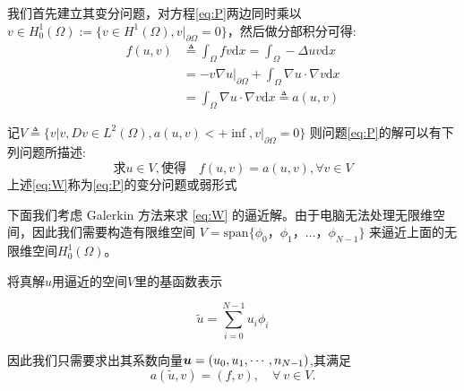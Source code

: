 我们首先建立其变分问题，对方程\eqref{eq:P}两边同时乘以$v \in H^1_0(\Omega) := \{v\in H^1(\Omega), v|_{\partial\Omega} = 0\}$，然后做分部积分可得:
\begin{align*}
	f(u,v) &\triangleq  \int_{\Omega} f v \mathrm{d}x = \int_{\Omega}- \Delta u v \mathrm{d}x  \\ 
	&=-v\nabla u \big|_{\partial \Omega} + \int_{\Omega} \nabla u\cdot\nabla v\mathrm{d}x \\
	&=\int_{\Omega} \nabla u\cdot\nabla v\mathrm{d}x\triangleq a(u,v)
\end{align*}

记$V \triangleq \{v \big| v,Dv \in L^2(\Omega) , a(u,v) < + \inf , v|_{\partial\Omega} = 0\}$
则问题\eqref{eq:P}的解可以有下列问题所描述:
\begin{equation}\label{eq:W}
	\text{求} u \in V, \text{使得}\quad f(u,v)=a(u,v) , \forall v \in V 
\end{equation}
上述\eqref{eq:W}称为\eqref{eq:P}的变分问题或弱形式

下面我们考虑 Galerkin 方法来求 \eqref{eq:W} 的逼近解。由于电脑无法处理无限维空间，因此我们需要构造有限维空间 $V=\mathrm{span}\{\phi_0，\phi_1，\ldots，
\phi_{N-1}\}$ 来逼近上面的无限维空间$H_0^1(\Omega)$。

将真解$u$用逼近的空间$V$里的基函数表示

\begin{equation}\label{eq:b}
	\tilde u= \sum_{i=0}^{N-1}u_i \phi_i
\end{equation}

因此我们只需要求出其系数向量${\boldsymbol u} = (u_0,u_1,\cdots,n_{N-1})$,其满足
\begin{equation}
	\label{eq:d}
	a(\tilde u, v) = (f, v),
	\quad\forall~v\in V.
\end{equation}

